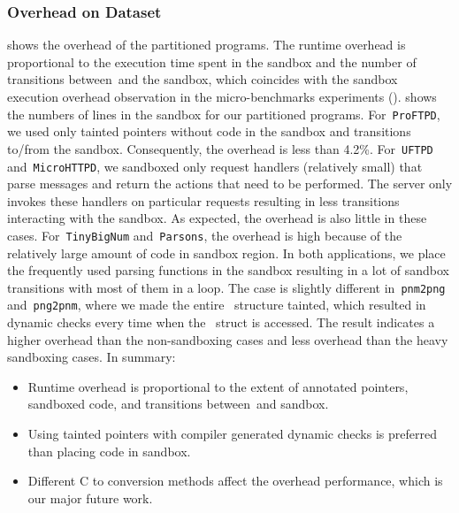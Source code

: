 \subsubsection{Overhead on Dataset}
\label{subsec:programoverhead}


%
 shows the overhead of the partitioned programs.
The runtime overhead is proportional to the execution time 
spent in the sandbox and the number of transitions between~\cregion and the sandbox,
which coincides with the sandbox execution overhead observation in the micro-benchmarks experiments ().
 shows the numbers of lines in the sandbox for our partitioned programs.
For~\texttt{ProFTPD}, we used only tainted pointers without code in the sandbox and transitions to/from the sandbox.
Consequently, the overhead is less than 4.2\%.
For~\texttt{UFTPD} and~\texttt{MicroHTTPD}, we sandboxed only request handlers (relatively small)
that parse messages and return the actions that need to be performed.
The server only invokes these handlers on particular requests resulting in less transitions interacting with the sandbox.
As expected, the overhead is also little in these cases.
For~\texttt{TinyBigNum} and~\texttt{Parsons}, the overhead is high because of the relatively large amount of code in sandbox region.
In both applications, we place the frequently used parsing functions in the sandbox 
resulting in a lot of sandbox transitions with most of them in a loop.
The case is slightly different in~\texttt{pnm2png} and~\texttt{png2pnm},
where we made the entire~ structure tainted, 
which resulted in dynamic checks every time when the~ struct is accessed.
The result indicates a higher overhead than the non-sandboxing cases and less overhead than the heavy sandboxing cases.
In summary:
\begin{itemize}
  \item Runtime overhead is proportional to the extent of annotated pointers, sandboxed code, and transitions between~\cregion and sandbox.
  \item Using tainted pointers with compiler generated dynamic checks is preferred than placing code in sandbox.
  \item Different C to \systemname conversion methods affect the overhead performance, which is our major future work.
\end{itemize}

